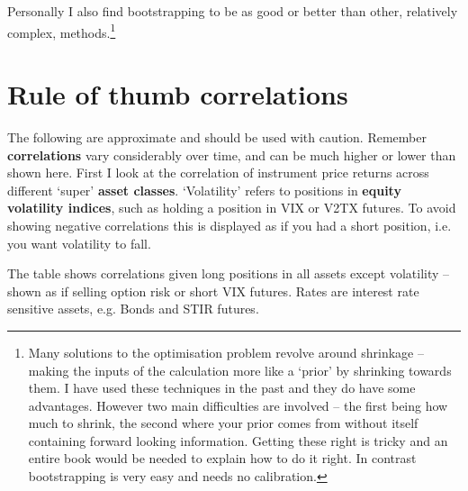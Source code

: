 Personally I also find bootstrapping to be as good or better than other, relatively complex, methods.\footnote{Many solutions to the optimisation problem revolve around shrinkage -- making the inputs of the calculation more like a ‘prior' by shrinking towards them. I have used these techniques in the past and they do have some advantages. However two main difficulties are involved -- the first being how much to shrink, the second where your prior comes from without itself containing forward looking information. Getting these right is tricky and an entire book would be needed to explain how to do it right. In contrast bootstrapping is very easy and needs no calibration.}

\section*{Rule of thumb correlations}  {}

The following are approximate and should be used with caution. Remember \textbf{correlations} vary considerably over time, and can be much higher or lower than shown here. First I look at the correlation of instrument price returns across different ‘super' \textbf{asset classes}. ‘Volatility' refers to positions in \textbf{equity volatility indices}, such as holding a position in VIX or V2TX futures. To avoid showing negative correlations this is displayed as if you had a short position, i.e. you want volatility to fall.

 

The table shows correlations given long positions in all assets except volatility -- shown as if selling option risk or short VIX futures. Rates are interest rate sensitive assets, e.g. Bonds and STIR futures.

